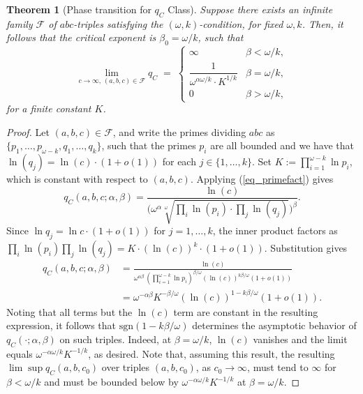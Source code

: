 \documentclass[11pt,letterpaper]{amsart}
\newtheorem{theorem}{Theorem}[section]
\def\ra{\rightarrow}
\begin{document}
\begin{theorem}[Phase transition for $q_C$ Class]\label{T_phase_transition}
Suppose there exists an infinite family $\mathcal{F}$ of $abc$-triples satisfying the $(\omega,k)$-condition, for fixed $\omega, k$. Then, it follows that the critical exponent is $\beta_0=\omega/k$, such that
\[
\lim_{c\to\infty,\,(a,b,c)\in\mathcal{F}} q_C \;=\; \begin{cases} \infty & \beta<\omega/k,\\[2pt] \dfrac{1}{\omega^{\alpha\omega/k} \cdot K^{1/k}} & \beta=\omega/k,\\[6pt] 0 & \beta>\omega/k, \end{cases}
\]
for a finite constant $K$.
\end{theorem}
\begin{proof}
Let $(a, b, c) \in \mathcal{F}$, and write the primes dividing $abc$ as $\{p_1,\dots,p_{\omega-k},q_1,\dots,q_k\}$, such that the primes $p_i$ are all bounded and we have that $\ln(q_j) = \ln (c) \cdot (1 + o(1))$ for each $j \in \{1, \dotsc, k\}$. Set $K := \prod_{i=1}^{\omega-k}\ln p_i $, which is constant with respect to $(a, b, c)$. Applying (\ref{eq_primefact}) gives
\[
q_C(a, b, c; \alpha, \beta) = \frac{\ln (c)}{\bigl(\omega^\alpha\sqrt[\omega]{\prod_i\ln (p_i)\cdot\prod_j\ln (q_j)}\bigr)^\beta}.
\]
Since $\ln q_j=\ln c\cdot(1+o(1))$ for $j=1,\dots,k$, the inner product factors as $\textstyle\prod_{i}\ln(p_i) \prod_j \ln(q_j) = K\cdot(\ln (c))^k\cdot(1+o(1))$. Substitution gives
\begin{align*}
q_C(a, b, c; \alpha, \beta) &= \frac{\ln (c)}{\omega^{\alpha\beta}\,\left(\prod_{i=1}^{\omega-k}\ln p_i \right)^{\beta/\omega}(\ln (c))^{k\beta/\omega} (1+o(1))}\\
 &= \omega^{-\alpha\beta}K^{-\beta/\omega}(\ln (c))^{1-k\beta/\omega}(1+o(1)).
\end{align*}
Noting that all terms but the $\ln(c)$ term are constant in the resulting expression, it follows that $\mathrm{sgn}(1-k\beta/\omega)$ determines the asymptotic behavior of $q_C(\cdot; \alpha, \beta)$ on such triples. Indeed, at $\beta=\omega/k$, $\ln(c)$ vanishes and the limit equals $\omega^{-\alpha\omega/k}K^{-1/k}$, as desired. Note that, assuming this result, the resulting $\lim\sup q_C(a, b, c_0)$ over triples $(a, b, c_0)$, as $c_0 \ra \infty$, must tend to $\infty$ for $\beta < \omega/k$ and must be bounded below by $\omega^{- \alpha \omega/k} K ^{-1/k}$ at $\beta = \omega/k$.
\end{proof}
\end{document}
